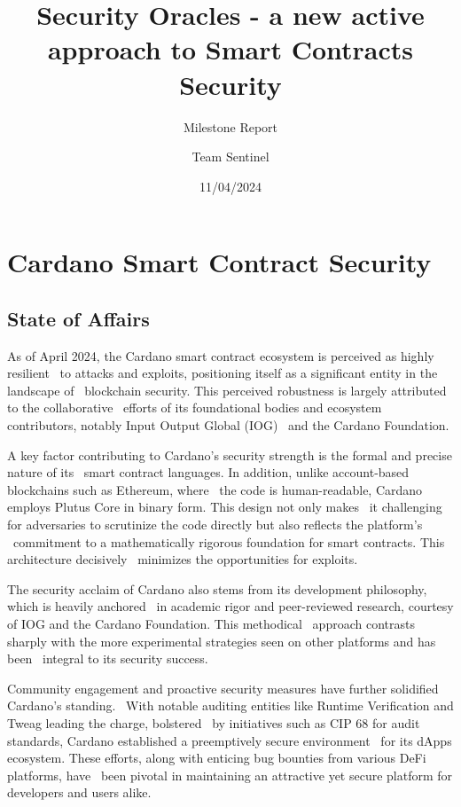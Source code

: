 \documentclass{scrreport}
\title{Security Oracles - a new active approach to Smart Contracts Security}
\subtitle{Milestone Report}
\author{Team Sentinel}
\date{11/04/2024}
\begin{document}
\maketitle

\tableofcontents


\chapter{Cardano Smart Contract Security}
\label{chap:introduction}

\section{State of Affairs}

As of April 2024, the Cardano smart contract ecosystem is perceived as highly resilient \
to attacks and exploits, positioning itself as a significant entity in the landscape of \
blockchain security. This perceived robustness is largely attributed to the collaborative \ 
efforts of its foundational bodies and ecosystem contributors, notably Input Output Global (IOG) \
and the Cardano Foundation.

A key factor contributing to Cardano's security strength is the formal and precise nature of its \
smart contract languages. In addition, unlike account-based blockchains such as Ethereum, where \
the code is human-readable, Cardano employs Plutus Core in binary form. This design not only makes \
it challenging for adversaries to scrutinize the code directly but also reflects the platform's \
commitment to a mathematically rigorous foundation for smart contracts. This architecture decisively \
minimizes the opportunities for exploits.

The security acclaim of Cardano also stems from its development philosophy, which is heavily anchored \
in academic rigor and peer-reviewed research, courtesy of IOG and the Cardano Foundation. This methodical \
approach contrasts sharply with the more experimental strategies seen on other platforms and has been \
integral to its security success.

Community engagement and proactive security measures have further solidified Cardano's standing. \
With notable auditing entities like Runtime Verification and Tweag leading the charge, bolstered \
by initiatives such as CIP 68 for audit standards, Cardano established a preemptively secure environment \
for its dApps ecosystem. These efforts, along with enticing bug bounties from various DeFi platforms, have \
been pivotal in maintaining an attractive yet secure platform for developers and users alike.
\end{document}
